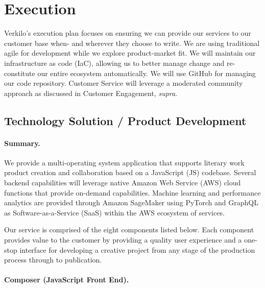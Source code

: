 \documentclass[10pt,openany]{book}
\begin{document}
\hypertarget{execution}{%
\chapter{Execution}\label{execution}}

Verkilo's execution plan focuses on ensuring we can provide our services
to our customer base when- and wherever they choose to write. We are
using traditional agile for development while we explore product-market
fit. We will maintain our infrastructure as code (IaC), allowing us to
better manage change and re-constitute our entire ecosystem
automatically. We will use GitHub for managing our code repository.
Customer Service will leverage a moderated community approach as
discussed in Customer Engagement, \emph{supra}.

\hypertarget{technology-solution-product-development}{%
\section{Technology Solution / Product
Development}\label{technology-solution-product-development}}

\hypertarget{summary.}{%
\subsubsection{Summary.}\label{summary.}}

We provide a multi-operating system application that supports literary
work product creation and collaboration based on a JavaScript (JS)
codebase. Several backend capabilities will leverage native Amazon Web
Service (AWS) cloud functions that provide on-demand capabilities.
Machine learning and performance analytics are provided through Amazon
SageMaker using PyTorch and GraphQL as Software-as-a-Service (SaaS)
within the AWS ecosystem of services.

Our service is comprised of the eight components listed below. Each
component provides value to the customer by providing a quality user
experience and a one-stop interface for developing a creative project
from any stage of the production process through to publication.

\hypertarget{composer-javascript-front-end.}{%
\subsubsection{Composer (JavaScript Front
End).}\label{composer-javascript-front-end.}}
\end{document}
